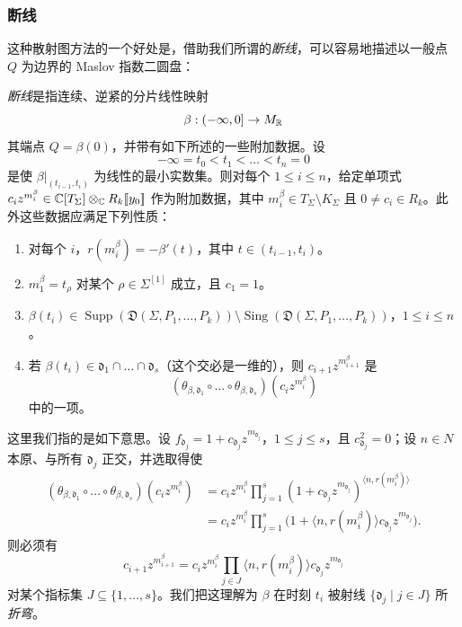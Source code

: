 \subsubsection{断线}
这种散射图方法的一个好处是，借助我们所谓的\emph{断线}，可以容易地描述以一般点 $Q$ 为边界的 Maslov 指数二圆盘：

\begin{definition}
\emph{断线}是指连续、逆紧的分片线性映射
\[
\beta : (-\infty,0] \to M_{\mathbb{R}}
\]
其端点 $Q=\beta(0)$，并带有如下所述的一些附加数据。设
\[
-\infty = t_0 < t_1 < \dots < t_n = 0
\]
是使 $\beta|_{(t_{i-1},t_i)}$ 为线性的最小实数集。则对每个 $1\le i\le n$，给定单项式
$c_iz^{m^\beta_i}\in \mathbb{C}[T_\Sigma]\otimes_{\mathbb{C}} R_k[\![y_0]\!]$ 作为附加数据，其中
$m^\beta_i\in T_\Sigma\setminus K_\Sigma$ 且 $0\ne c_i\in R_k$。此外这些数据应满足下列性质：
\begin{enumerate}[label=(\arabic*),leftmargin=*]
\item 对每个 $i$，$r(m^\beta_i) = -\beta'(t)$，其中 $t\in(t_{i-1},t_i)$。
\item $m^\beta_1 = t_\rho$ 对某个 $\rho\in\Sigma^{[1]}$ 成立，且 $c_1 = 1$。
\item $\beta(t_i)\in\operatorname{Supp}(\mathfrak D(\Sigma,P_1,\dots,P_k))\setminus
\operatorname{Sing}(\mathfrak D(\Sigma,P_1,\dots,P_k))$，$1\le i\le n$。
\item 若 $\beta(t_i)\in\mathfrak d_1\cap\dots\cap\mathfrak d_s$（这个交必是一维的），则
$c_{i+1}z^{m^\beta_{i+1}}$ 是
\[
(\theta_{\beta,\mathfrak d_1}\circ\dots\circ\theta_{\beta,\mathfrak d_s})(c_iz^{m^\beta_i})
\]
中的一项。
\end{enumerate}
这里我们指的是如下意思。设 $f_{\mathfrak d_j} = 1+c_{\mathfrak d_j}z^{m_{\mathfrak d_j}}$，$1\le j\le s$，且
$c^2_{\mathfrak d_j}=0$；设 $n\in N$ 本原、与所有 $\mathfrak d_j$ 正交，并选取得使
\begin{align*}
(\theta_{\beta,\mathfrak d_1}\circ\dots\circ\theta_{\beta,\mathfrak d_s})(c_iz^{m^\beta_i})
&= c_iz^{m^\beta_i}\prod_{j=1}^s(1+c_{\mathfrak d_j}z^{m_{\mathfrak d_j}})^{\langle n,r(m^\beta_i)\rangle}\\
&= c_iz^{m^\beta_i}\prod_{j=1}^s\bigl(1+\langle n,r(m^\beta_i)\rangle c_{\mathfrak d_j}z^{m_{\mathfrak d_j}}\bigr).
\end{align*}
则必须有
\[
c_{i+1}z^{m^\beta_{i+1}} = c_iz^{m^\beta_i}\prod_{j\in J}\langle n,r(m^\beta_i)\rangle c_{\mathfrak d_j}z^{m_{\mathfrak d_j}}
\]
对某个指标集 $J\subseteq\{1,\dots,s\}$。我们把这理解为 $\beta$ 在时刻 $t_i$ 被射线
$\{\mathfrak d_j \mid j\in J\}$ 所\emph{折弯}。
\end{definition}

